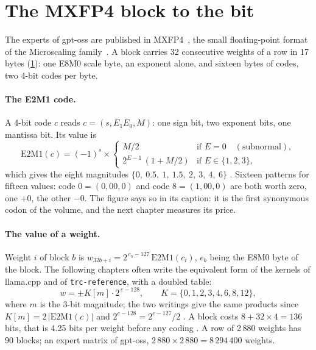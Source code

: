 \section{The MXFP4 block to the bit}\label{t3que:sec:mxfp4}

The experts of gpt-oss are published in MXFP4~\cite{openai2025gptoss}, the small floating-point format of the Microscaling family~\cite{rouhani2023microscaling,ocpmx2023}. A block carries 32 consecutive weights of a row in 17 bytes (\cref{fig:t3-ecl-bloc}): one E8M0 scale byte, an exponent alone, and sixteen bytes of codes, two 4-bit codes per byte.

\begin{figure}[tbp]
\centering
\GrapheEclBloc
{}
\label{fig:t3-ecl-bloc}
\end{figure}

\paragraph{The E2M1 code.} A 4-bit code $c$ reads $c = (s, E_1E_0, M)$: one sign bit, two exponent bits, one mantissa bit. Its value is
\begin{equation}\label{t3que:eq:e2m1}
\mathrm{E2M1}(c) = (-1)^{s} \times
\begin{cases}
M/2 & \text{if } E = 0 \quad(\text{subnormal}),\\
2^{E-1}\,(1 + M/2) & \text{if } E \in \{1, 2, 3\},
\end{cases}
\end{equation}
which gives the eight magnitudes $\{0,\ 0.5,\ 1,\ 1.5,\ 2,\ 3,\ 4,\ 6\}$ \calc. Sixteen patterns for fifteen values: code $0 = (0, 00, 0)$ and code $8 = (1, 00, 0)$ are both worth zero, one $+0$, the other $-0$. The figure says so in its caption: it is the first synonymous codon of the volume, and the next chapter measures its price.

\paragraph{The value of a weight.} Weight $i$ of block $b$ is $w_{32b+i} = 2^{\,e_b - 127}\,\mathrm{E2M1}(c_i)$, $e_b$ being the E8M0 byte of the block. The following chapters often write the equivalent form of the kernels of llama.cpp and of \texttt{trc-reference}, with a doubled table:
\begin{equation}\label{t3que:eq:k}
w = \pm K[m]\cdot 2^{\,e-128}, \qquad K = \{0, 1, 2, 3, 4, 6, 8, 12\},
\end{equation}
where $m$ is the 3-bit magnitude; the two writings give the same products since $K[m] = 2\,|\mathrm{E2M1}(c)|$ and $2^{e-128} = 2^{e-127}/2$ \calc. A block costs $8 + 32 \times 4 = 136$ bits, that is 4.25 bits per weight before any coding \calc. A row of 2\,880 weights has 90 blocks; an expert matrix of gpt-oss, $2\,880 \times 2\,880 = 8\,294\,400$ weights.

